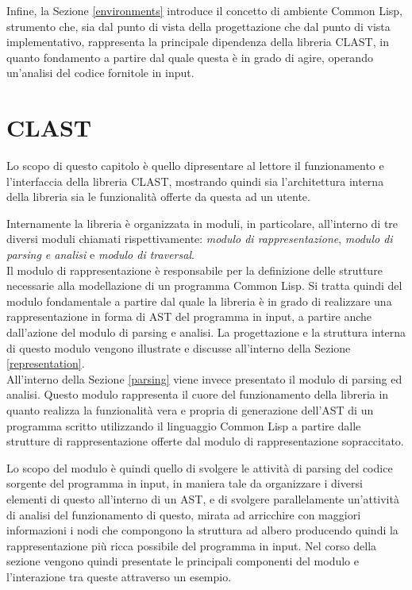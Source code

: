 \documentclass{book}
\begin{document}
Infine, la Sezione \ref{environments} introduce il concetto di ambiente Common
Lisp, strumento che, sia dal punto di vista della progettazione che dal punto di
vista implementativo, rappresenta la principale dipendenza della libreria CLAST,
in quanto fondamento a partire dal quale questa è in grado di agire, operando
un'analisi del codice fornitole in input.






\endgroup

\begingroup
\let\clearpage\relax

\chapter{CLAST}
\label{library}

Lo scopo di questo capitolo è quello dipresentare al lettore il funzionamento e
l'interfaccia della libreria CLAST, mostrando quindi sia l'architettura interna
della libreria sia le funzionalità offerte da questa ad un utente.

Internamente la libreria è organizzata in moduli, in particolare, all'interno di
tre diversi moduli chiamati rispettivamente: \textit{modulo di
rappresentazione}, \textit{modulo di parsing e analisi} e \textit{modulo di
traversal}.\\

Il modulo di rappresentazione è responsabile per la definizione delle strutture
necessarie alla modellazione di un programma Common Lisp. Si tratta quindi del
modulo fondamentale a partire dal quale la libreria è in grado di realizzare una
rappresentazione in forma di AST del programma in input, a partire anche
dall'azione del modulo di parsing e analisi. La progettazione e la struttura
interna di questo modulo vengono illustrate e discusse all'interno della Sezione
\ref{representation}.\\

All'interno della Sezione \ref{parsing} viene invece presentato il modulo di
parsing ed analisi. Questo modulo rappresenta il cuore del funzionamento della
libreria in quanto realizza la funzionalità vera e propria di generazione
dell'AST di un programma scritto utilizzando il linguaggio Common Lisp a partire
dalle strutture di rappresentazione offerte dal modulo di rappresentazione
sopraccitato.

Lo scopo del modulo è quindi quello di svolgere le attività di parsing del
codice sorgente del programma in input, in maniera tale da organizzare i diversi
elementi di questo all'interno di un AST, e di svolgere parallelamente
un'attività di analisi del funzionamento di questo, mirata ad arricchire con
maggiori informazioni i nodi che compongono la struttura ad albero producendo
quindi la rappresentazione più ricca possibile del programma in input. Nel corso
della sezione vengono quindi presentate le principali componenti del modulo e
l'interazione tra queste attraverso un esempio.\\
\end{document}
